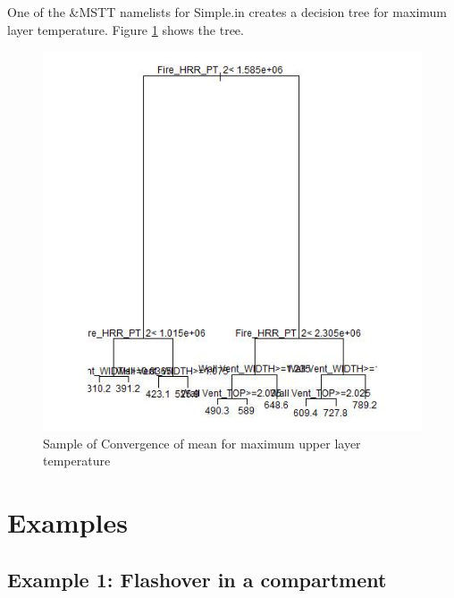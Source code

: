 \documentclass[12pt,twoside]{book}
\begin{document}
One of the {\ct \&MSTT} namelists for Simple.in creates a decision tree for maximum layer temperature. Figure \ref{simple_tree_temp} shows the tree.

\begin{figure}[h!]
\centering
\includegraphics[width=6.5in]{FIGURES/simple_tree_temp.jpeg}
\caption{Sample of Convergence of mean for maximum upper layer temperature}
\label{simple_tree_temp}
\end{figure}

%
%

\chapter{Examples}

%
%

\section{Example 1: Flashover in a compartment}
\end{document}

